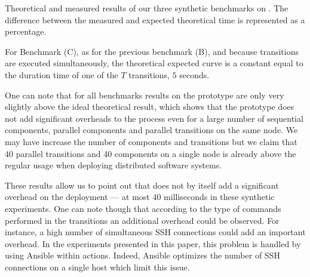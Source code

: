 \begin{table}
	\begin{center}
		
		\caption{Theoretical and measured results of our three synthetic 
		benchmarks on \ecotype. The difference between the measured and expected 
		theoretical time is represented as a percentage.}
		\label{tab:resultssynt}
	\end{center}
\end{table}

For Benchmark (C), as for the previous benchmark (B), and because transitions are executed simultaneously, the theoretical expected curve is a constant equal to the duration time of one of the $T$ transitions, \ie $5$ seconds. 

One can note that for all benchmarks results on the \mad prototype are only very slightly above the ideal theoretical result, which shows that the prototype does not add significant overheads to the process even for a large number of sequential components, parallel components and parallel transitions on the same node.  We may have increase the number of components and transitions but we claim that 40 parallel transitions and 40 components on a single node is already above the regular usage when deploying distributed software systems.


These results allow us to point out that \mad does not by itself add a significant overhead on the deployment --- at most 40 milliseconds in these synthetic experiments. One can note though that according to the type of commands performed in the transitions  an additional overhead could be observed. For instance, a high number of simultaneous SSH connections could add an important overhead. In the experiments presented in this paper, this problem is handled by using Ansible within actions. Indeed, Ansible optimizes the number of SSH connections on a single host which limit this issue.



